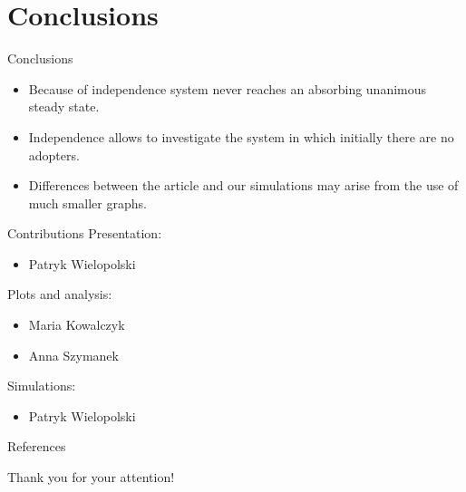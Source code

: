 \documentclass[10pt]{beamer}
\begin{document}
\section{Conclusions}

\begin{frame}{Conclusions}
	\begin{itemize}
		\item Because of independence system never reaches an absorbing unanimous steady state.
		\item Independence allows to investigate the system in which initially there are no adopters.
		\item Differences between the article and our simulations may arise from the use of much smaller graphs.
	\end{itemize}
\end{frame}

\begin{frame}{Contributions}
	Presentation:
	\begin{itemize}
		\item Patryk Wielopolski
	\end{itemize}
	Plots and analysis:
	\begin{itemize}
		\item Maria Kowalczyk
		\item Anna Szymanek
	\end{itemize}
	Simulations:
	\begin{itemize}
		\item Patryk Wielopolski
	\end{itemize}
\end{frame}

\begin{frame}[allowframebreaks]{References}	
	
	
\end{frame}

\begin{frame}
	 \centering
	{\Large Thank you for your attention!}
	
\end{frame}
\end{document}
